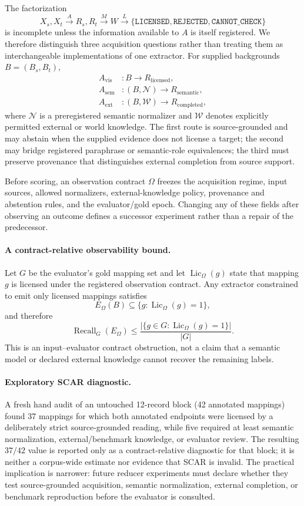 The factorization
\[
X_s,X_t \xrightarrow{A} R_s,R_t \xrightarrow{M} W \xrightarrow{L}
\{\texttt{LICENSED},\texttt{REJECTED},\texttt{CANNOT\_CHECK}\}
\]
is incomplete unless the information available to $A$ is itself registered.  We
therefore distinguish three acquisition questions rather than treating them as
interchangeable implementations of one extractor.  For supplied backgrounds
$B=(B_s,B_t)$,
\begin{align*}
A_{\mathrm{vis}} &: B \longrightarrow R_{\mathrm{licensed}},\\
A_{\mathrm{sem}} &: (B,\mathcal N) \longrightarrow R_{\mathrm{semantic}},\\
A_{\mathrm{ext}} &: (B,\mathcal W) \longrightarrow R_{\mathrm{completed}},
\end{align*}
where $\mathcal N$ is a preregistered semantic normalizer and $\mathcal W$ denotes
explicitly permitted external or world knowledge.  The first route is
source-grounded and may abstain when the supplied evidence does not license a target;
the second may bridge registered paraphrase or semantic-role equivalences; the third
must preserve provenance that distinguishes external completion from source support.

Before scoring, an observation contract $\Omega$ freezes the acquisition regime,
input sources, allowed normalizers, external-knowledge policy, provenance and
abstention rules, and the evaluator/gold epoch.  Changing any of these fields after
observing an outcome defines a successor experiment rather than a repair of the
predecessor.

\paragraph{A contract-relative observability bound.}
Let $G$ be the evaluator's gold mapping set and let
$\operatorname{Lic}_{\Omega}(g)$ state that mapping $g$ is licensed under the
registered observation contract.  Any extractor constrained to emit only licensed
mappings satisfies
\[
E_{\Omega}(B)\subseteq\{g:\operatorname{Lic}_{\Omega}(g)=1\},
\]
and therefore
\[
\operatorname{Recall}_{G}(E_{\Omega})
\leq
\frac{|\{g\in G:\operatorname{Lic}_{\Omega}(g)=1\}|}{|G|}.
\]
This is an input--evaluator contract obstruction, not a claim that a semantic model
or declared external knowledge cannot recover the remaining labels.

\paragraph{Exploratory SCAR diagnostic.}
A fresh hand audit of an untouched 12-record block (42 annotated mappings) found 37
mappings for which both annotated endpoints were licensed by a deliberately strict
source-grounded reading, while five required at least semantic normalization,
external/benchmark knowledge, or evaluator review.  The resulting $37/42$ value is
reported only as a contract-relative diagnostic for that block; it is neither a
corpus-wide estimate nor evidence that SCAR is invalid.  The practical implication is
narrower: future reducer experiments must declare whether they test source-grounded
acquisition, semantic normalization, external completion, or benchmark reproduction
before the evaluator is consulted.

